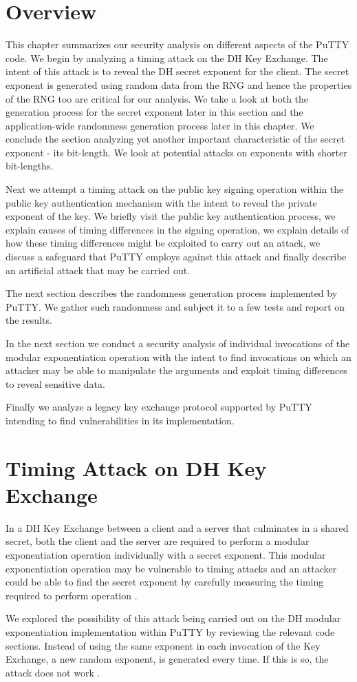 \documentclass{bhamthesis}
\begin{document}
\section{Overview}
This chapter summarizes our security analysis on different aspects of the PuTTY code. We begin by analyzing a timing attack on the DH Key Exchange. The intent of this attack is to reveal the DH secret exponent for the client. The secret exponent is generated using random data from the RNG and hence the properties of the RNG too are critical for our analysis. We take a look at both the generation process for the secret exponent later in this section and the application-wide randomness generation process later in this chapter. We conclude the section analyzing yet another important characteristic of the secret exponent - its bit-length. We look at potential attacks on exponents with shorter bit-lengths. \par
Next we attempt a timing attack on the public key signing operation within the public key authentication mechanism with the intent to reveal the private exponent of the key. We briefly visit the public key authentication process, we explain causes of timing differences in the signing operation, we explain details of how these timing differences might be exploited to carry out an attack, we discuss a safeguard that PuTTY employs against this attack and finally describe an artificial attack that may be carried out. \par
The next section describes the randomness generation process implemented by PuTTY. We gather such randomness and subject it to a few tests and report on the results. \par
In the next section we conduct a security analysis of individual invocations of the modular exponentiation operation with the intent to find invocations on which an attacker may be able to manipulate the arguments and exploit timing differences to reveal sensitive data.\par 
Finally we analyze a legacy key exchange protocol supported by PuTTY intending to find vulnerabilities in its implementation.
\section{Timing Attack on DH Key Exchange}
In a DH Key Exchange between a client and a server that culminates in a shared secret, both the client and the server are required to perform a modular exponentiation operation individually with a secret exponent. This modular exponentiation operation may be vulnerable to timing attacks and an attacker could be able to find the secret exponent by carefully measuring the timing required to perform operation \cite{kocher96}.\par
We explored the possibility of this attack being carried out on the DH modular exponentiation implementation within PuTTY by reviewing the relevant code sections. Instead of using the same exponent in each invocation of the Key Exchange, a new random exponent, is generated every time. If this is so, the attack does not work \cite{kocher96}.
\end{document}
